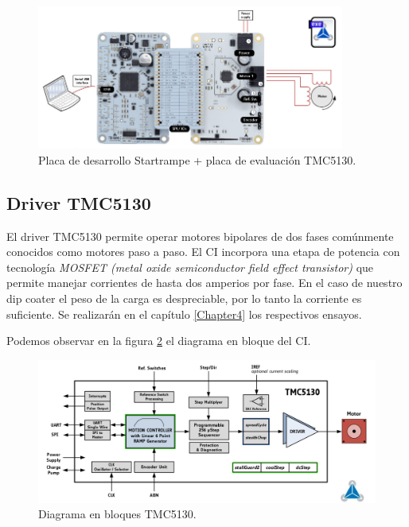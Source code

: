 \begin{figure}[htpb]
\centering 
\includegraphics[width=0.9\textwidth]{./Figures/tmc5130_placa.png}
\caption{Placa de desarrollo Startrampe + placa de evaluación TMC5130.}
\label{fig:tmc5130_placa}
\end{figure}


  
\subsection{Driver TMC5130}

El driver TMC5130 permite operar motores bipolares de dos fases comúnmente conocidos como motores paso a paso. El CI incorpora una etapa de potencia con tecnología \textit{MOSFET (metal oxide semiconductor field effect transistor)}  que permite manejar corrientes de hasta dos amperios por fase. En el caso de nuestro dip coater el peso de la carga es despreciable, por lo tanto la corriente es suficiente. Se realizarán en el capítulo \ref{Chapter4} los respectivos ensayos.

Podemos observar en la figura \ref{fig:tmc5130_diagrama} el diagrama en bloque del CI.

\begin{figure}[htpb]
\centering 
\includegraphics[width=1.1\textwidth]{./Figures/tmc5130_diagrama.png}
\caption{Diagrama en bloques TMC5130.}
\label{fig:tmc5130_diagrama}
\end{figure}

